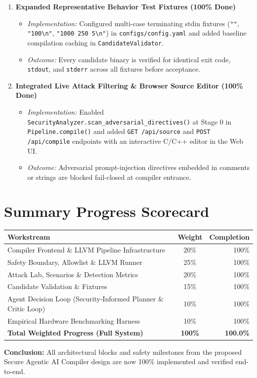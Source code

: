 \documentclass[11pt]{article}
\begin{document}
\begin{enumerate}
  \item \textbf{Expanded Representative Behavior Test Fixtures (100\% Done)}
  \begin{itemize}
    \item \textit{Implementation:} Configured multi-case terminating stdin fixtures (\texttt{""}, \texttt{"100\textbackslash n"}, \texttt{"1000 250 5\textbackslash n"}) in \texttt{configs/config.yaml} and added baseline compilation caching in \texttt{CandidateValidator}.
    \item \textit{Outcome:} Every candidate binary is verified for identical exit code, \texttt{stdout}, and \texttt{stderr} across all fixtures before acceptance.
  \end{itemize}

  \item \textbf{Integrated Live Attack Filtering \& Browser Source Editor (100\% Done)}
  \begin{itemize}
    \item \textit{Implementation:} Enabled \texttt{SecurityAnalyzer.scan\_adversarial\_directives()} at Stage 0 in \texttt{Pipeline.compile()} and added \texttt{GET /api/source} and \texttt{POST /api/compile} endpoints with an interactive C/C++ editor in the Web UI.
    \item \textit{Outcome:} Adversarial prompt-injection directives embedded in comments or strings are blocked fail-closed at compiler entrance.
  \end{itemize}
\end{enumerate}

\section{Summary Progress Scorecard}

\begin{center}
\begin{tabularx}{0.9\linewidth}{@{}lcr@{}}
\toprule
\textbf{Workstream} & \textbf{Weight} & \textbf{Completion} \\
\midrule
Compiler Frontend \& LLVM Pipeline Infrastructure & 20\% & 100\% \\
Safety Boundary, Allowlist \& LLVM Runner & 25\% & 100\% \\
Attack Lab, Scenarios \& Detection Metrics & 20\% & 100\% \\
Candidate Validation \& Fixtures & 15\% & 100\% \\
Agent Decision Loop (Security-Informed Planner \& Critic Loop) & 10\% & 100\% \\
Empirical Hardware Benchmarking Harness & 10\% & 100\% \\
\midrule
\textbf{Total Weighted Progress (Full System)} & \textbf{100\%} & \textbf{100.0\%} \\
\bottomrule
\end{tabularx}
\end{center}

\noindent\textbf{Conclusion:} All architectural blocks and safety milestones from the proposed Secure Agentic AI Compiler design are now 100\% implemented and verified end-to-end.
\end{document}
